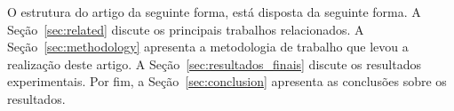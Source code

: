 O estrutura do artigo da seguinte forma, está disposta da seguinte forma. A Seção~\ref{sec:related} discute os principais trabalhos relacionados. A Seção~\ref{sec:methodology} apresenta a metodologia de trabalho que levou a realização deste artigo. A Seção~\ref{sec:resultados_finais} discute os resultados experimentais. Por fim, a Seção~\ref{sec:conclusion} apresenta as conclusões sobre os resultados.

